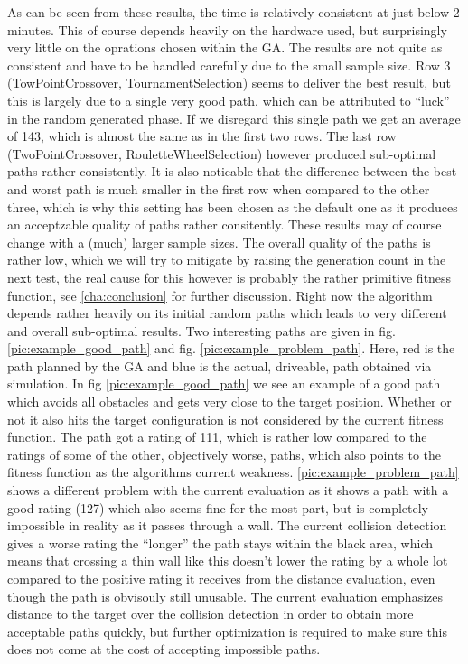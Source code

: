 As can be seen from these results, the time is relatively consistent at just below 2 minutes. This of course depends heavily on the hardware used, but surprisingly very little on the oprations chosen within the GA. The results are not quite as consistent and have to be handled carefully due to the small sample size. Row 3 (TowPointCrossover, TournamentSelection) seems to deliver the best result, but this is largely due to a single very good path, which can be attributed to "`luck"' in the random generated phase. If we disregard this single path we get an average of 143, which is almost the same as in the first two rows. The last row (TwoPointCrossover, RouletteWheelSelection) however produced sub-optimal paths rather consistently. It is also noticable that the difference between the best and worst path is much smaller in the first row when compared to the other three, which is why this setting has been chosen as the default one as it produces an acceptzable quality of paths rather consitently. These results may of course change with a (much) larger sample sizes.
The overall quality of the paths is rather low, which we will try to mitigate by raising the generation count in the next test, the real cause for this however is probably the rather primitive fitness function, see \ref{cha:conclusion} for further discussion. Right now the algorithm depends rather heavily on its initial random paths which leads to very different and overall sub-optimal results.
Two interesting paths are given in fig. \ref{pic:example_good_path} and fig. \ref{pic:example_problem_path}. Here, red is the path planned by the GA and blue is the actual, driveable, path obtained via simulation. In fig \ref{pic:example_good_path} we see an example of a good path which avoids all obstacles and gets very close to the target position. Whether or not it also hits the target configuration is not considered by the current fitness function. The path got a rating of 111, which is rather low compared to the ratings of some of the other, objectively worse, paths, which also points to the fitness function as the algorithms current weakness. \ref{pic:example_problem_path} shows a different problem with the current evaluation as it shows a path with a good rating (127) which also seems fine for the most part, but is completely impossible in reality as it passes through a wall. The current collision detection gives a worse rating the "`longer"' the path stays within the black area, which means that crossing a thin wall like this doesn't lower the rating by a whole lot compared to the positive rating it receives from the distance evaluation, even though the path is obvisouly still unusable. The current evaluation emphasizes distance to the target over the collision detection in order to obtain more acceptable paths quickly, but further optimization is required to make sure this does not come at the cost of accepting impossible paths.

